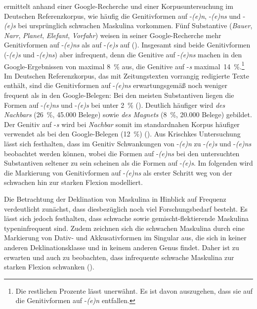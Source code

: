 \textcite{Krischke.2012} ermittelt anhand einer Google-Re\-cher\-che und einer Korpusuntersuchung im Deutschen Referenzkorpus, wie häufig die Genitivformen auf -\textit{(e)n}, -\textit{(e)ns} und -\textit{(e)s} bei ursprünglich schwachen Maskulina vorkommen. Fünf Substantive (\textit{Bauer}, \textit{Narr}, \textit{Planet}, \textit{Elefant}, \textit{Vorfahr}) weisen in seiner Google-Re\-cher\-che mehr Genitivformen auf -\textit{(e)ns} als auf -\textit{(e)s} auf (\cite[65]{Krischke.2012}). Insgesamt sind beide Genitivformen (-\textit{(e)s} und -\textit{(e)ns}) aber infrequent, denn die Genitive auf -\textit{(e)ns} machen in den Google-Ergebnissen von \textcite[65]{Krischke.2012} maximal 8~\% aus, die Genitive auf -\textit{s} maximal~14~\%.\footnote{Die restlichen Prozente lässt \textcite[65]{Krischke.2012} unerwähnt. Es ist davon auszugehen, dass sie auf die Genitivformen auf -\textit{(e)n} entfallen.} Im Deutschen Referenzkorpus, das mit Zeitungstexten vorrangig redigierte Texte enthält, sind die Genitivformen auf -\textit{(e)ns} erwartungsgemäß noch weniger frequent als in den Google-Belegen: Bei den meisten Substantiven liegen die Formen auf -\textit{(e)ns} und -\textit{(e)s} bei unter 2~\% (\cite[65]{Krischke.2012}). Deutlich häufiger wird \textit{des Nachbars} (26~\%, 45.000 Belege) sowie \textit{des Magnets} (8~\%, 20.000 Belege) gebildet. Der Genitiv auf -\textit{s} wird bei \textit{Nachbar} somit im standardnahen Korpus häufiger verwendet als bei den Google-Belegen (12~\%) (\cite[65]{Krischke.2012}). Aus Krischkes Untersuchung lässt sich festhalten, dass im Genitiv Schwankungen von -\textit{(e)n} zu -\textit{(e)s} und -\textit{(e)ns} beobachtet werden können, wobei die Formen auf -\textit{(e)ns} bei den untersuchten Substantiven seltener zu sein scheinen als die Formen auf -\textit{(e)s}. Im folgenden  wird die Markierung von Genitivformen auf -\textit{(e)ns} als erster Schritt weg von der schwachen hin zur starken Flexion modelliert. 

Die Betrachtung der Deklination von Maskulina in Hinblick auf Frequenz verdeutlicht zunächst, dass diesbezüglich noch viel Forschungsbedarf besteht. Es lässt sich jedoch festhalten, dass schwache sowie gemischt-flektierende Maskulina typeninfrequent sind. Zudem zeichnen sich die schwachen Maskulina durch eine Markierung von Dativ- und Akkusativformen im Singular aus, die sich in keiner anderen Deklinationsklasse und in keinem anderen Genus findet. Daher ist zu erwarten und auch zu beobachten, dass infrequente schwache Maskulina zur starken Flexion schwanken (\cite[404--405]{Schafer.2019}). 


